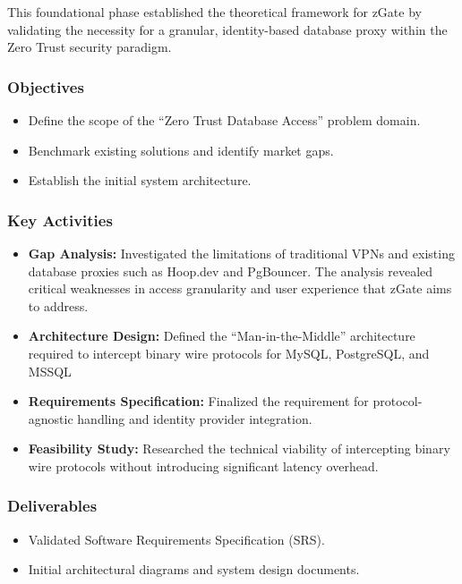 This foundational phase established the theoretical framework for zGate by validating the necessity for a granular, identity-based database proxy within the Zero Trust security paradigm.

\subsubsection{Objectives}
\begin{itemize}
    \item Define the scope of the ``Zero Trust Database Access'' problem domain.
    \item Benchmark existing solutions and identify market gaps.
    \item Establish the initial system architecture.
\end{itemize}

\subsubsection{Key Activities}
\begin{itemize}
    \item \textbf{Gap Analysis:} Investigated the limitations of traditional VPNs and existing database proxies such as Hoop.dev and PgBouncer. The analysis revealed critical weaknesses in access granularity and user experience that zGate aims to address.
    \item \textbf{Architecture Design:} Defined the ``Man-in-the-Middle'' architecture required to intercept binary wire protocols for MySQL, PostgreSQL, and MSSQL
    \item \textbf{Requirements Specification:} Finalized the requirement for protocol-agnostic handling and identity provider integration.
    \item \textbf{Feasibility Study:} Researched the technical viability of intercepting binary wire protocols without introducing significant latency overhead.
\end{itemize}

\subsubsection{Deliverables}
\begin{itemize}
    \item Validated Software Requirements Specification (SRS).
    \item Initial architectural diagrams and system design documents.
\end{itemize}

